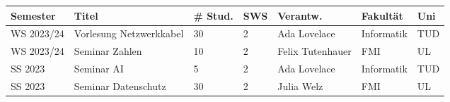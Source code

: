 \begin{longtable}{|p{}|p{}|p{}|p{}|p{}|p{}|p{}|}
\hline
Semester & Titel & # Stud. & SWS & Verantw. & Fakultät & Uni \\ \hline
\hline
WS 2023/24 & Vorlesung Netzwerkkabel & 30 & 2 & Ada Lovelace & Informatik & TUD \\ \hline
WS 2023/24 & Seminar Zahlen & 10 & 2 & Felix Tutenhauer & FMI & UL \\ \hline
SS 2023 & Seminar AI & 5 & 2 & Ada Lovelace & Informatik & TUD \\ \hline
SS 2023 & Seminar Datenschutz & 30 & 2 & Julia Welz & FMI & UL \\ \hline
\hline
\end{longtable}
